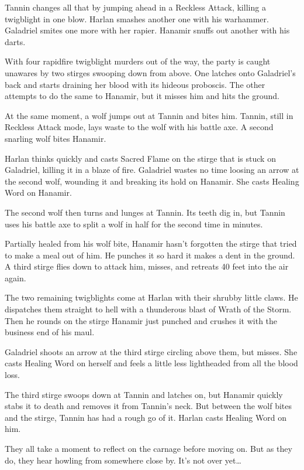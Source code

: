 \documentclass[smalldemyvopaper,11pt,twoside,onecolumn,openright,extrafontsizes]{memoir}
\begin{document}
Tannin changes all that by jumping ahead in a Reckless Attack, killing a
twigblight in one blow. Harlan smashes another one with his warhammer.
Galadriel smites one more with her rapier. Hanamir snuffs out another
with his darts.

With four rapidfire twigblight murders out of the way, the party is
caught unawares by two stirges swooping down from above. One latches
onto Galadriel's back and starts draining her blood with its hideous
proboscis. The other attempts to do the same to Hanamir, but it misses
him and hits the ground.

At the same moment, a wolf jumps out at Tannin and bites him. Tannin,
still in Reckless Attack mode, lays waste to the wolf with his battle
axe. A second snarling wolf bites Hanamir.

Harlan thinks quickly and casts Sacred Flame on the stirge that is stuck
on Galadriel, killing it in a blaze of fire. Galadriel wastes no time
loosing an arrow at the second wolf, wounding it and breaking its hold
on Hanamir. She casts Healing Word on Hanamir.

The second wolf then turns and lunges at Tannin. Its teeth dig in, but
Tannin uses his battle axe to split a wolf in half for the second time
in minutes.

Partially healed from his wolf bite, Hanamir hasn't forgotten the stirge
that tried to make a meal out of him. He punches it so hard it makes a
dent in the ground. A third stirge flies down to attack him, misses, and
retreats 40 feet into the air again.

The two remaining twigblights come at Harlan with their shrubby little
claws. He dispatches them straight to hell with a thunderous blast of
Wrath of the Storm. Then he rounds on the stirge Hanamir just punched
and crushes it with the business end of his maul.

Galadriel shoots an arrow at the third stirge circling above them, but
misses. She casts Healing Word on herself and feels a little less
lightheaded from all the blood loss.

The third stirge swoops down at Tannin and latches on, but Hanamir
quickly stabs it to death and removes it from Tannin's neck. But between
the wolf bites and the stirge, Tannin has had a rough go of it. Harlan
casts Healing Word on him.

They all take a moment to reflect on the carnage before moving on. But
as they do, they hear howling from somewhere close by. It's not over
yet\ldots{}
\end{document}
